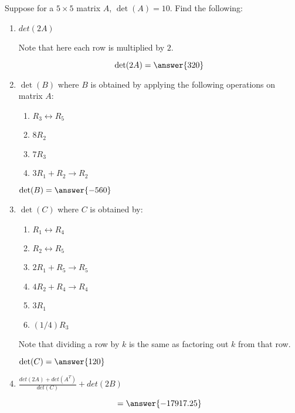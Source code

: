 \documentclass{ximera}
\author{Parisa Fatheddin}
\begin{document}
\begin{exercise}
  Suppose for a $5\times 5$ matrix $A$, $\det(A)=10$. Find the following:
  \begin{enumerate}
  \item $det(2A)$
    \begin{prompt}
      \begin{hint}
        Note that here each row is multiplied by $2$.
      \end{hint}
      \[ \det(2A)= \answer{320}\]
    \end{prompt}
  \item $\det(B)$ where $B$ is obtained by applying the following operations on matrix $A$:
    \begin{enumerate}
    \item $R_{3} \leftrightarrow R_{5}$
    \item $8R_{2}$
    \item $7 R_{3}$
    \item $3R_{1}+ R_{2} \to R_{2}$
    \end{enumerate}
    \begin{prompt}
      $\det(B)= \answer{-560}$
    \end{prompt}
  \item $\det(C)$ where $C$ is obtained by:
    \begin{enumerate}
    \item $R_{1}\leftrightarrow R_{4}$
    \item $R_{2} \leftrightarrow R_{5}$
    \item $2R_{1} + R_{5} \to R_{5}$
    \item $4R_{2} + R_{4} \to R_{4}$
    \item $3R_{1}$
    \item $(1/4) R_{3}$
    \end{enumerate}
    \begin{prompt}
      \begin{hint}
        Note that dividing a row by $k$ is the same as factoring out $k$ from that row.
      \end{hint}
      $\det(C) = \answer{120}$
    \end{prompt}
  \item $\frac{det(2A) + det (A^T)}{det(C)} + det(2B)$
    \begin{prompt}
      \[ = \answer{-17917.25}\]
    \end{prompt}
  \end{enumerate}
\end{exercise}
\end{document}

